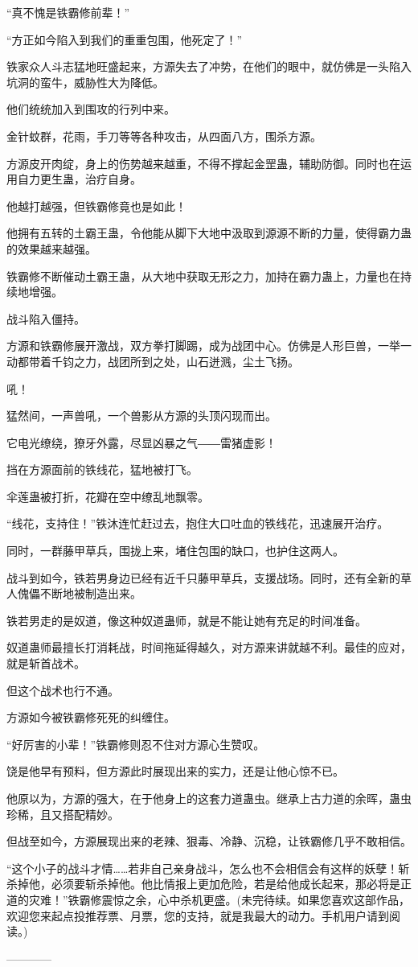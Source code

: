 \begin{this_body}
“真不愧是铁霸修前辈！”

“方正如今陷入到我们的重重包围，他死定了！”

铁家众人斗志猛地旺盛起来，方源失去了冲势，在他们的眼中，就仿佛是一头陷入坑洞的蛮牛，威胁性大为降低。

他们统统加入到围攻的行列中来。

金针蚊群，花雨，手刀等等各种攻击，从四面八方，围杀方源。

方源皮开肉绽，身上的伤势越来越重，不得不撑起金罡蛊，辅助防御。同时也在运用自力更生蛊，治疗自身。

他越打越强，但铁霸修竟也是如此！

他拥有五转的土霸王蛊，令他能从脚下大地中汲取到源源不断的力量，使得霸力蛊的效果越来越强。

铁霸修不断催动土霸王蛊，从大地中获取无形之力，加持在霸力蛊上，力量也在持续地增强。

战斗陷入僵持。

方源和铁霸修展开激战，双方拳打脚踢，成为战团中心。仿佛是人形巨兽，一举一动都带着千钧之力，战团所到之处，山石迸溅，尘土飞扬。

吼！

猛然间，一声兽吼，一个兽影从方源的头顶闪现而出。

它电光缭绕，獠牙外露，尽显凶暴之气――雷猪虚影！

挡在方源面前的铁线花，猛地被打飞。

伞莲蛊被打折，花瓣在空中缭乱地飘零。

“线花，支持住！”铁沐连忙赶过去，抱住大口吐血的铁线花，迅速展开治疗。

同时，一群藤甲草兵，围拢上来，堵住包围的缺口，也护住这两人。

战斗到如今，铁若男身边已经有近千只藤甲草兵，支援战场。同时，还有全新的草人傀儡不断地被制造出来。

铁若男走的是奴道，像这种奴道蛊师，就是不能让她有充足的时间准备。

奴道蛊师最擅长打消耗战，时间拖延得越久，对方源来讲就越不利。最佳的应对，就是斩首战术。

但这个战术也行不通。

方源如今被铁霸修死死的纠缠住。

“好厉害的小辈！”铁霸修则忍不住对方源心生赞叹。

饶是他早有预料，但方源此时展现出来的实力，还是让他心惊不已。

他原以为，方源的强大，在于他身上的这套力道蛊虫。继承上古力道的余晖，蛊虫珍稀，且又搭配精妙。

但战至如今，方源展现出来的老辣、狠毒、冷静、沉稳，让铁霸修几乎不敢相信。

“这个小子的战斗才情……若非自己亲身战斗，怎么也不会相信会有这样的妖孽！斩杀掉他，必须要斩杀掉他。他比情报上更加危险，若是给他成长起来，那必将是正道的灾难！”铁霸修震惊之余，心中杀机更盛。(未完待续。如果您喜欢这部作品，欢迎您来起点投推荐票、月票，您的支持，就是我最大的动力。手机用户请到阅读。)

------------

\end{this_body}


